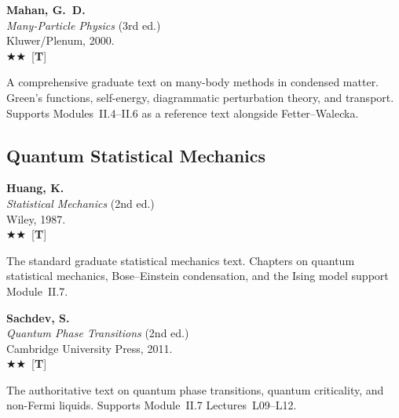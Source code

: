 \documentclass[11pt,a4paper]{article}
\newcommand{\recommended}{$\bigstar\bigstar$}
\newenvironment{bibentry}[1]{\begin{tcolorbox}[entrybox=#1,top=4pt,bottom=4pt]}{\end{tcolorbox}\smallskip}
\begin{document}
\begin{bibentry}{t4light}
\textbf{Mahan, G.~D.}\\
\textit{Many-Particle Physics} (3rd ed.)\\
Kluwer/Plenum, 2000.\\[3pt]
\recommended\ [\textbf{T}]\\[3pt]
\begin{tcolorbox}[annotbox]
A comprehensive graduate text on many-body methods in condensed matter. Green's
functions, self-energy, diagrammatic perturbation theory, and transport.
Supports Modules~II.4--II.6 as a reference text alongside Fetter--Walecka.
\end{tcolorbox}
\end{bibentry}

\subsection{Quantum Statistical Mechanics}

\begin{bibentry}{t4light}
\textbf{Huang, K.}\\
\textit{Statistical Mechanics} (2nd ed.)\\
Wiley, 1987.\\[3pt]
\recommended\ [\textbf{T}]\\[3pt]
\begin{tcolorbox}[annotbox]
The standard graduate statistical mechanics text. Chapters on quantum statistical
mechanics, Bose--Einstein condensation, and the Ising model support Module~II.7.
\end{tcolorbox}
\end{bibentry}

\begin{bibentry}{t4light}
\textbf{Sachdev, S.}\\
\textit{Quantum Phase Transitions} (2nd ed.)\\
Cambridge University Press, 2011.\\[3pt]
\recommended\ [\textbf{T}]\\[3pt]
\begin{tcolorbox}[annotbox]
The authoritative text on quantum phase transitions, quantum criticality, and
non-Fermi liquids. Supports Module~II.7 Lectures~L09--L12.
\end{tcolorbox}
\end{bibentry}
\end{document}
